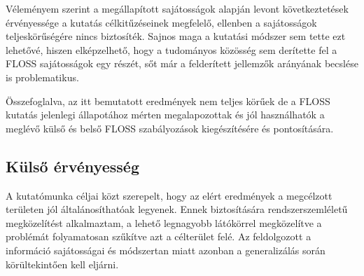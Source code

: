 \documentclass[12pt,magyar,a4paper,oneside]{scrreprt}
\begin{document}
Véleményem szerint a megállapított sajátosságok alapján levont
következtetések érvényessége a kutatás célkitűzéseinek megfelelő,
ellenben a sajátosságok teljeskörűségére nincs biztosíték. Sajnos maga a
kutatási módszer sem tette ezt lehetővé, hiszen elképzelhető, hogy a
tudományos közösség sem derítette fel a FLOSS sajátosságok egy részét,
sőt már a felderített jellemzők arányának becslése is problematikus.

Összefoglalva, az itt bemutatott eredmények nem teljes körűek de a FLOSS
kutatás jelenlegi állapotához mérten megalapozottak és jól használhatók
a meglévő külső és belső FLOSS szabályozások kiegészítésére és
pontosítására.

\hypertarget{kuxfclsux151-uxe9rvuxe9nyessuxe9g}{%
\subsection{Külső érvényesség}\label{kuxfclsux151-uxe9rvuxe9nyessuxe9g}}

A kutatómunka céljai közt szerepelt, hogy az elért eredmények a
megcélzott területen jól általánosíthatóak legyenek. Ennek biztosítására
rendszerszemléletű megközelítést alkalmaztam, a lehető legnagyobb
látókörrel megközelítve a problémát folyamatosan szűkítve azt a
célterület felé. Az feldolgozott a információ sajátosságai és módszertan
miatt azonban a generalizálás során körültekintően kell eljárni.
\end{document}
